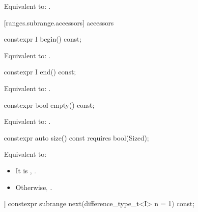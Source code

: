 \begin{addedblock}
\begin{itemdescr}
\pnum
\effects Equivalent to: .
\end{itemdescr}

[ranges.subrange.accessors]{ accessors}

%
\begin{itemdecl}
constexpr I begin() const;
\end{itemdecl}

\begin{itemdescr}
\pnum
\effects Equivalent to: .
\end{itemdescr}

%
\begin{itemdecl}
constexpr I end() const;
\end{itemdecl}

\begin{itemdescr}
\pnum
\effects Equivalent to: .
\end{itemdescr}

%
\begin{itemdecl}
constexpr bool empty() const;
\end{itemdecl}

\begin{itemdescr}
\pnum
\effects Equivalent to: .
\end{itemdescr}

%
\begin{itemdecl}
constexpr auto size() const requires bool(Sized);
\end{itemdecl}

\begin{itemdescr}
\pnum
\effects Equivalent to:
\begin{itemize}
\item It  is , .
\item Otherwise, .
\end{itemize}
\end{itemdescr}

%
\begin{itemdecl}
[[nodiscard]] constexpr subrange next(difference_type_t<I> n = 1) const;
\end{itemdecl}


\end{addedblock}
